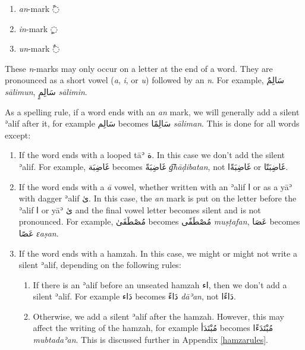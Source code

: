 \documentclass[
  10pt,
]{book}
\providecommand{\tightlist}{%
  \setlength{\itemsep}{0pt}\setlength{\parskip}{0pt}}
\begin{document}
\begin{enumerate}
\def\labelenumi{\arabic{enumi}.}
\tightlist
\item
  \emph{an}-mark \foreignlanguage{arabic}{◌ً}
\item
  \emph{in}-mark \foreignlanguage{arabic}{◌ٍ}
\item
  \emph{un}-mark \foreignlanguage{arabic}{◌ٌ}
\end{enumerate}

These \emph{n}-marks may only occur on a letter at the end of a word. They are pronounced as a short vowel (\emph{a}, \emph{i}, or \emph{u}) followed by an \emph{n}. For example, \foreignlanguage{arabic}{سَالِمٌ} \emph{sālimun}, \foreignlanguage{arabic}{سَالِمٍ} \emph{sālimin}.

As a spelling rule, if a word ends with an \emph{an} mark, we will generally add a silent ʾalif after it, for example \foreignlanguage{arabic}{سَالِم} becomes \foreignlanguage{arabic}{سَالِمًا} \emph{sāliman}. This is done for all words except:

\begin{enumerate}
\def\labelenumi{\arabic{enumi}.}
\item
  If the word ends with a looped tāʾ \foreignlanguage{arabic}{ة}. In this case we don't add the silent ʾalif. For example, \foreignlanguage{arabic}{غَاضِبَة} becomes \foreignlanguage{arabic}{غَاضِبَةً} \emph{g͡hāḍibatan}, not \foreignlanguage{arabic}{غَاضِبَةًا} or \foreignlanguage{arabic}{غَاضِبَتًا}.
\item
  If the word ends with a \emph{ā} vowel, whether written with an ʾalif \foreignlanguage{arabic}{ا} or as a yāʾ with dagger ʾalif \foreignlanguage{arabic}{ىٰ}. In this case, the \emph{an} mark is put on the letter before the ʾalif \foreignlanguage{arabic}{ا} or yāʾ \foreignlanguage{arabic}{ىٰ} and the final vowel letter becomes silent and is not pronounced. For example, \foreignlanguage{arabic}{مُصْطَفَىٰ} becomes \foreignlanguage{arabic}{مُصْطَفًى} \emph{muṣṭafan}, \foreignlanguage{arabic}{عَصَا} becomes \foreignlanguage{arabic}{عَصًا} \emph{ɛaṣan}.
\item
  If the word ends with a hamzah. In this case, we might or might not write a silent ʾalif, depending on the following rules:

  \begin{enumerate}
  \def\labelenumii{\alph{enumii}.}
  \item
    If there is an ʾalif before an unseated hamzah \foreignlanguage{arabic}{اء}, then we don't add a silent ʾalif. For example \foreignlanguage{arabic}{دَاء} becomes \foreignlanguage{arabic}{دَاءً} \emph{dāʾan}, not \foreignlanguage{arabic}{دَاءًا}.
  \item
    Otherwise, we add a silent ʾalif after the hamzah. However, this may affect the writing of the hamzah, for example \foreignlanguage{arabic}{مُبْتَدَأ} becomes \foreignlanguage{arabic}{مُبْتَدَءًا} \emph{mubtadaʾan}. This is discussed further in Appendix \ref{hamzarules}.
  \end{enumerate}
\end{enumerate}
\end{document}
